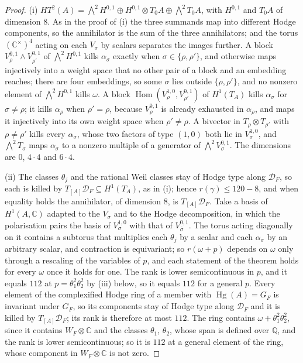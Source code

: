 \documentclass[11pt,reqno]{amsart}
\theoremstyle{plain}
\theoremstyle{definition}
\theoremstyle{remark}
\newcommand{\QQ}{\mathbb{Q}}
\newcommand{\CC}{\mathbb{C}}
\newcommand{\cD}{\mathcal{D}}
\DeclareMathOperator{\Hom}{Hom}
\DeclareMathOperator{\Hg}{Hg}
\newcommand{\bbar}[1]{\overline{#1}}
\begin{document}
\begin{proof}
(i) $HT^{2}(A)=\bigwedge^{2}H^{0,1}\oplus H^{0,1}\otimes T_{0}A\oplus
\bigwedge^{2}T_{0}A$, with $H^{0,1}$ and $T_{0}A$ of dimension $8$. As in the
proof of (i) the three summands map into different Hodge
components, so the annihilator is the sum of the three annihilators; and the
torus $(\CC^{\times})^{4}$ acting on each $V_{\sigma}$ by scalars separates the
images further. A block $V_{\rho}^{0,1}\wedge V_{\rho'}^{0,1}$ of
$\bigwedge^{2}H^{0,1}$ kills $\alpha_{\sigma}$ exactly when
$\sigma\in\{\rho,\rho'\}$, and otherwise maps injectively into a weight space
that no other pair of a block and an embedding reaches; there are four
embeddings, so some $\sigma$ lies outside $\{\rho,\rho'\}$, and no nonzero
element of $\bigwedge^{2}H^{0,1}$ kills $\omega$. A block
$\Hom(V_{\rho}^{1,0},V_{\rho'}^{0,1})$ of $H^{1}(T_{A})$ kills $\alpha_{\sigma}$
for $\sigma\ne\rho$; it kills $\alpha_{\rho}$ when $\rho'=\rho$, because
$V_{\rho}^{0,1}$ is already exhausted in $\alpha_{\rho}$, and maps it
injectively into its own weight space when $\rho'\ne\rho$. A bivector in
$T_{\rho}\otimes T_{\rho'}$ with $\rho\ne\rho'$ kills every $\alpha_{\sigma}$,
whose two factors of type $(1,0)$ both lie in $V_{\sigma}^{1,0}$, and
$\bigwedge^{2}T_{\sigma}$ maps $\alpha_{\sigma}$ to a nonzero multiple of a
generator of $\bigwedge^{2}V_{\sigma}^{0,1}$. The dimensions are $0$,
$4\cdot4$ and $6\cdot4$.

(ii) The classes $\theta_{j}$ and the rational Weil classes stay of Hodge type
along $\cD_{F}$, so each is killed by $T_{[A]}\cD_{F}\subseteq H^{1}(T_{A})$, as
in (i); hence $r(\gamma)\le120-8$, and when equality
holds the annihilator, of dimension $8$, is $T_{[A]}\cD_{F}$. Take a basis of
$H^{1}(A,\CC)$ adapted to the $V_{\sigma}$ and to the Hodge decomposition, in
which the polarisation pairs the basis of $V_{\sigma}^{1,0}$ with that of
$V_{\bbar\sigma}^{0,1}$. The torus acting diagonally on it contains a subtorus
that multiplies each $\theta_{j}$ by a scalar and each $\alpha_{\sigma}$ by an
arbitrary scalar, and contraction is equivariant; so $r(\omega+p)$ depends on
$\omega$ only through a rescaling of the variables of $p$, and each statement
of the theorem holds for every $\omega$ once it holds for one. The rank is
lower semicontinuous in $p$, and it equals $112$ at
$p=\theta_{1}^{2}\theta_{2}^{2}$ by (iii) below, so it
equals $112$ for a general $p$. Every element of the complexified Hodge ring
of a member with $\Hg(A)=G_{F}$ is invariant under $G_{F}$, so its components
stay of Hodge type along $\cD_{F}$ and it is killed by $T_{[A]}\cD_{F}$; its
rank is therefore at most $112$. The ring contains $\omega+\theta_{1}^{2}
\theta_{2}^{2}$, since it contains $W_{F}\otimes\CC$ and the classes
$\theta_{1}$, $\theta_{2}$, whose span is defined over $\QQ$, and the rank
is lower semicontinuous; so it is $112$ at a general element of the ring, whose
component in $W_{F}\otimes\CC$ is not zero.


\end{proof}
\end{document}
